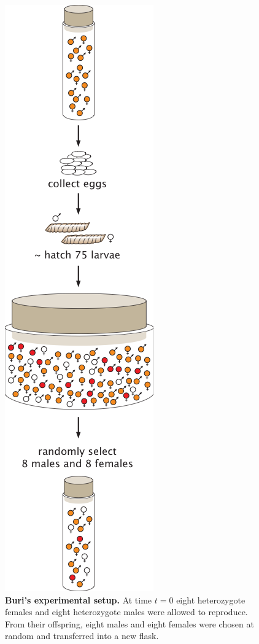 \begin{figure}[h!]
\centering \includegraphics[scale=0.8]
  {../fig/drift_langevin/02_buri_schematic.png}
  \caption{\textbf{Buri's experimental setup.} At time $t=0$ eight
  heterozygote females and eight heterozygote males were allowed to reproduce.
  From their offspring, eight males and eight females were chosen at random and
  transferred into a new flask.}
  \label{fig_02_buri_schematic}
\end{figure}

